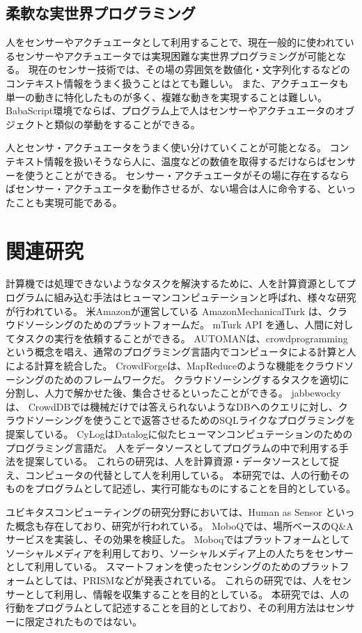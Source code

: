 \documentclass{deimj}
\begin{document}
\subsection{柔軟な実世界プログラミング}
人をセンサーやアクチュエータとして利用することで、現在一般的に使われているセンサーやアクチュエータでは実現困難な実世界プログラミングが可能となる。
現在のセンサー技術では、その場の雰囲気を数値化・文字列化するなどのコンテキスト情報をうまく扱うことはとても難しい。
また、アクチュエータも単一の動きに特化したものが多く、複雑な動きを実現することは難しい。
BabaScript環境でならば、プログラム上で人はセンサーやアクチュエータのオブジェクトと類似の挙動をすることができる。

人とセンサ・アクチュエータをうまく使い分けていくことが可能となる。
コンテキスト情報を扱いそうなら人に、温度などの数値を取得するだけならばセンサーを使うとことができる。
センサー・アクチュエータがその場に存在するならばセンサー・アクチュエータを動作させるが、ない場合は人に命令する、といったことも実現可能である。


\section{関連研究}
計算機では処理できないようなタスクを解決するために、人を計算資源としてプログラムに組み込む手法はヒューマンコンピュテーション\cite{humancomputation}と呼ばれ、様々な研究が行われている。
米Amazonが運営している AmazonMechanicalTurk\cite{amt} は、クラウドソーシングのためのプラットフォームだ。
mTurk API を通し、人間に対してタスクの実行を依頼することができる。
AUTOMAN\cite{automan}は、crowdprogrammingという概念を唱え、通常のプログラミング言語内でコンピュータによる計算と人による計算を統合した。
CrowdForge\cite{crowdforge}は、MapReduceのような機能をクラウドソーシングのためのフレームワークだ。
クラウドソーシングするタスクを適切に分割し、人力で解かせた後、集合させるといったことができる。
jabbewocky\cite{jabberwocky}は、
CrowdDB\cite{crowddb}では機械だけでは答えられないようなDBへのクエリに対し、クラウドソーシングを使うことで返答させるためのSQLライクなプログラミングを提案している。
CyLog\cite{cylog}はDatalogに似たヒューマンコンピュテーションのためのプログラミング言語だ。
人をデータソースとしてプログラムの中で利用する手法を提案している。
これらの研究は、人を計算資源・データソースとして捉え、コンピュータの代替として人を利用している。
本研究では、人の行動そのものをプログラムとして記述し、実行可能なものにすることを目的としている。

ユビキタスコンピューティングの研究分野においては、Human as Sensor といった概念も存在しており、研究が行われている。
MoboQ\cite{moboq}では、場所ベースのQ\&Aサービスを実装し、その効果を検証した。
Moboqではプラットフォームとしてソーシャルメディアを利用しており、ソーシャルメディア上の人たちをセンサーとして利用している。
スマートフォンを使ったセンシングのためのプラットフォームとしては、PRISM\cite{prism}などが発表されている。
これらの研究では、人をセンサーとして利用し、情報を収集することを目的としている。
本研究では、人の行動をプログラムとして記述することを目的としており、その利用方法はセンサーに限定されたものではない。
\end{document}
